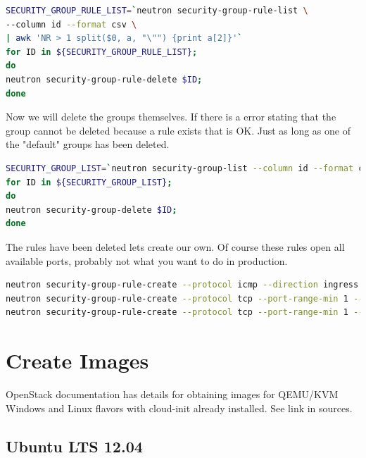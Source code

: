 \documentclass[11pt,letterpaper,oneside]{book}
\begin{document}
\begin{lstlisting}[caption={Delete existing security group rules},language=bash]
SECURITY_GROUP_RULE_LIST=`neutron security-group-rule-list \
--column id --format csv \
| awk 'NR > 1 split($0, a, "\"") {print a[2]}'`
for ID in ${SECURITY_GROUP_RULE_LIST}; 
do 
neutron security-group-rule-delete $ID; 
done
\end{lstlisting}

Now we will delete the groups themselves.  If there is a error stating that the group cannot be deleted because a rule exists that is OK.  Just as long as one of the "default" groups has been deleted.
\begin{lstlisting}[caption={Delete existing security groups},language=bash]
SECURITY_GROUP_LIST=`neutron security-group-list --column id --format csv | awk 'NR > 1 split($0, a, "\"") {print a[2]}'`
for ID in ${SECURITY_GROUP_LIST}; 
do 
neutron security-group-delete $ID; 
done
\end{lstlisting}

The rules have been deleted lets create our own.  Of course these rules open all available ports, probably not what you want to do in production.  
\begin{lstlisting}[caption={},language=bash]
neutron security-group-rule-create --protocol icmp --direction ingress default 
neutron security-group-rule-create --protocol tcp --port-range-min 1 --port-range-max 65535 --direction ingress default 
neutron security-group-rule-create --protocol tcp --port-range-min 1 --port-range-max 65535 --direction egress default 
\end{lstlisting}
\section{Create Images}
OpenStack documentation has details for obtaining images for QEMU/KVM Windows and Linux flavors with cloud-init already installed. See link in sources.
\subsection{Ubuntu LTS 12.04}
\end{document}
